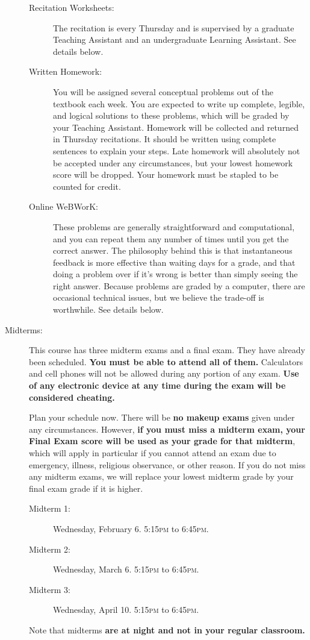 \documentclass[11pt]{article}
\begin{document}
\begin{description}
  \begin{description}
  \item[Recitation Worksheets:] The recitation is every Thursday and is
    supervised by a graduate Teaching Assistant and an undergraduate
    Learning Assistant.  See details below.
  \item[Written Homework:] You will be assigned several conceptual
    problems out of the textbook each week. You are expected to write
    up complete, legible, and logical solutions to these problems,
    which will be graded by your Teaching Assistant. Homework will be
    collected and returned in Thursday recitations. It should be
    written using complete sentences to explain your steps. Late
    homework will absolutely not be accepted under any circumstances,
    but your lowest homework score will be dropped.  Your homework
    must be stapled to be counted for credit.
  \item[Online WeBWorK:] These problems are generally straightforward
    and computational, and you can repeat them any number of times
    until you get the correct answer. The philosophy behind this is
    that instantaneous feedback is more effective than waiting days
    for a grade, and that doing a problem over if it's wrong is better
    than simply seeing the right answer. Because problems are graded
    by a computer, there are occasional technical issues, but we
    believe the trade-off is worthwhile. See details below.
  \end{description}

\item[Midterms:] This course has three midterm exams and a final
  exam. They have already been scheduled. \textbf{You must be able to
    attend all of them.} Calculators and cell phones will not be
  allowed during any portion of any exam. \textbf{Use of any
    electronic device at any time during the exam will be considered
    cheating.}

  Plan your schedule now. There will be \textbf{no makeup exams} given
  under any circumstances. However, \textbf{if you must miss a midterm
    exam, your Final Exam score will be used as your grade for that
    midterm}, which will apply in particular if you cannot attend an
  exam due to emergency, illness, religious observance, or other
  reason.  If you do not miss any midterm exams, we will replace your
  lowest midterm grade by your final exam grade if it is higher.

  \begin{description}
  \item[Midterm 1:] Wednesday, February 6. 5:15\textsc{pm} to
    6:45\textsc{pm}.
  \item[Midterm 2:] Wednesday, March 6. 5:15\textsc{pm} to
    6:45\textsc{pm}.
  \item[Midterm 3:] Wednesday, April 10. 5:15\textsc{pm} to
    6:45\textsc{pm}.
  \end{description}
  Note that midterms {\bf are at night and not in your regular
    classroom.}


\end{description}
\end{document}
